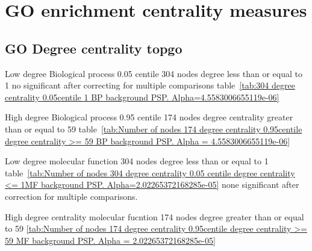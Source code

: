 \section{GO enrichment centrality measures}


\subsection{GO Degree centrality topgo}

Low degree Biological process 0.05 centile 304 nodes degree less than or equal to 1 no significant after correcting for multiple comparisons table~\ref{tab:304 degree centrality 0.05centile  1 BP background PSP. Alpha=4.5583006655119e-06}

High degree Biological process 0.95 centile 174 nodes degree centrality greater than or equal to 59 table~\ref{tab:Number of nodes 174 degree centrality 0.95centile  degree centrality >= 59 BP background PSP. Alpha = 4.5583006655119e-06}

Low degree molecular function 304 nodes degree less than or equal to 1  table~\ref{tab:Number of nodes 304 degree centrality 0.05 centile  degree centrality <= 1MF background PSP. Alpha=2.02265372168285e-05} none significant after correction for multiple comparisons.

High degree centrality molecular fucntion 174 nodes degree greater than or equal to 59 \ref{tab:Number of nodes 174 degree centrality 0.95centile  degree centrality >= 59 MF background PSP. Alpha = 2.02265372168285e-05}

